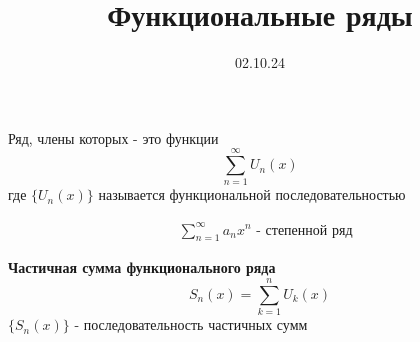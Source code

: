

\title{Функциональные ряды}
\date{02.10.24}


\maketitle

\begin{opr}
    Ряд, члены которых - это функции
    \begin{equation}
        \sum_{n = 1}^{\infty} U_{n}(x)
    \end{equation}
    где \(\{U_{n}(x)\}\) называется функциональной последовательностью 
\end{opr}

\begin{ex}
    \begin{equation}
        \begin{align*}
            &\sum_{n = 1}^{\infty} a_{n}x^{n} \text{  - степенной ряд}
        \end{align*}
    \end{equation}
\end{ex}

\begin{opr}
    \textbf{Частичная сумма функционального ряда}
    \begin{equation}
        S_{n}(x) = \sum_{k = 1}^{n}U_{k}(x)
    \end{equation}
    \(\{S_{n}(x)\}\) - последовательность частичных сумм 
\end{opr}

